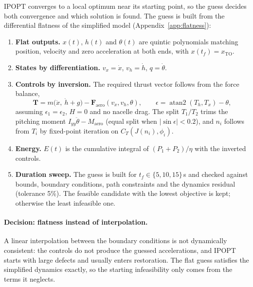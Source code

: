 \documentclass[11pt,a4paper]{article}
\begin{document}
IPOPT converges to a local optimum near its starting point, so the guess decides both
convergence and which solution is found. The guess is built from the differential flatness of
the simplified model (Appendix~\ref{app:flatness}):
\begin{enumerate}
  \item \textbf{Flat outputs.} $x(t)$, $h(t)$ and $\theta(t)$ are quintic polynomials matching
        position, velocity and zero acceleration at both ends, with $x(t_f) = x_\text{TO}$.
  \item \textbf{States by differentiation.} $v_x = \dot x$, $v_h = \dot h$, $q = \dot\theta$.
  \item \textbf{Controls by inversion.} The required thrust vector follows from the force balance,
        \begin{equation}
        \mathbf{T} = m\big(\ddot x,\ \ddot h + g\big) - \mathbf{F}_\text{aero}(v_x, v_h, \theta),
        \qquad \epsilon = \operatorname{atan2}(T_h, T_x) - \theta,
        \end{equation}
        assuming $\epsilon_1 = \epsilon_2$, $H = 0$ and no nacelle drag. The split $T_1/T_2$ trims the
        pitching moment $I_{yy}\ddot\theta - M_\text{aero}$ (equal split when $|\sin\epsilon| < 0.2$),
        and $n_i$ follows from $T_i$ by fixed-point iteration on $C_T(J(n_i), \phi_i)$.
  \item \textbf{Energy.} $E(t)$ is the cumulative integral of $(P_1+P_2)/\eta$ with the inverted controls.
  \item \textbf{Duration sweep.} The guess is built for $t_f \in \{5, 10, 15\}\,$s and checked against
        bounds, boundary conditions, path constraints and the dynamics residual (tolerance 5\%).
        The feasible candidate with the lowest objective is kept; otherwise the least infeasible one.
\end{enumerate}

\paragraph{Decision: flatness instead of interpolation.} A linear interpolation between the
boundary conditions is not dynamically consistent: the controls do not produce the guessed
accelerations, and IPOPT starts with large defects and usually enters restoration. The flat guess
satisfies the simplified dynamics exactly, so the starting infeasibility only comes from the terms it
neglects.

\end{document}
